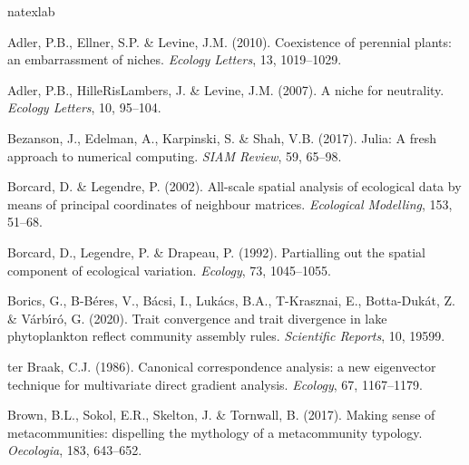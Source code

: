 \begin{thebibliography}{70}
	\expandafter\ifx\csname natexlab\endcsname\relax\def\natexlab#1{#1}\fi
	
	Adler, P.B., Ellner, S.P. \& Levine, J.M. (2010).
	\newblock Coexistence of perennial plants: an embarrassment of niches.
	\newblock \emph{Ecology Letters}, 13, 1019--1029.
	
	Adler, P.B., HilleRisLambers, J. \& Levine, J.M. (2007).
	\newblock A niche for neutrality.
	\newblock \emph{Ecology Letters}, 10, 95--104.
	
	Bezanson, J., Edelman, A., Karpinski, S. \& Shah, V.B. (2017).
	\newblock Julia: A fresh approach to numerical computing.
	\newblock \emph{SIAM Review}, 59, 65--98.
	
	Borcard, D. \& Legendre, P. (2002).
	\newblock All-scale spatial analysis of ecological data by means of principal
	coordinates of neighbour matrices.
	\newblock \emph{Ecological Modelling}, 153, 51--68.
	
	Borcard, D., Legendre, P. \& Drapeau, P. (1992).
	\newblock Partialling out the spatial component of ecological variation.
	\newblock \emph{Ecology}, 73, 1045--1055.

	Borics, G., B-B{\'e}res, V., B{\'a}csi, I., Luk{\'a}cs, B.A., T-Krasznai, E.,
  	Botta-Duk{\'a}t, Z. \& V{\'a}rb{\'\i}r{\'o}, G. (2020).
	\newblock Trait convergence and trait divergence in lake phytoplankton reflect
  	community assembly rules.
	\newblock \emph{Scientific Reports}, 10, 19599.
	
	ter Braak, C.J. (1986).
	\newblock Canonical correspondence analysis: a new eigenvector technique for
	multivariate direct gradient analysis.
	\newblock \emph{Ecology}, 67, 1167--1179.
	
	Brown, B.L., Sokol, E.R., Skelton, J. \& Tornwall, B. (2017).
	\newblock Making sense of metacommunities: dispelling the mythology of a
	metacommunity typology.
	\newblock \emph{Oecologia}, 183, 643--652.
	

\end{thebibliography}
